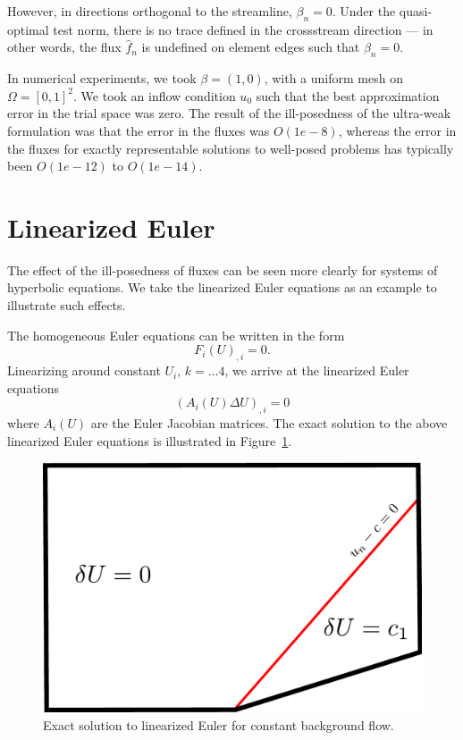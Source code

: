 However, in directions orthogonal to the streamline, $\beta_n = 0$. Under the quasi-optimal test norm, there is no trace defined in the crossstream direction --- in other words, the flux $\widehat{f}_n$ is undefined on element edges such that $\beta_n = 0$. 

In numerical experiments, we took $\beta = (1,0)$, with a uniform mesh on $\Omega = [0,1]^2$. We took an inflow condition $u_0$ such that the best approximation error in the trial space was zero. The result of the ill-posedness of the ultra-weak formulation was that the error in the fluxes was $O(1e-8)$, whereas the error in the fluxes for exactly representable solutions to well-posed problems has typically been $O(1e-12)$ to $O(1e-14)$. 

\section{Linearized Euler}
The effect of the ill-posedness of fluxes can be seen more clearly for systems of hyperbolic equations. We take the linearized Euler equations as an example to illustrate such effects. 

The homogeneous Euler equations can be written in the form
\[
F_i(U)_{,i} = 0.
\]
Linearizing around constant $U_i$, $k = \ldots 4$, we arrive at the linearized Euler equations 
\[
\left(A_i(U)\Delta U\right)_{,i} = 0
\]
where $A_i(U)$ are the Euler Jacobian matrices. The exact solution to the above linearized Euler equations is illustrated in Figure~\ref{fig:linEulerExact}. 

\begin{figure}[!h]
\centering
\includegraphics[scale = .5]{figs/linEulerExact.pdf}
\caption{Exact solution to linearized Euler for constant background flow.}
\label{fig:linEulerExact}
\end{figure}

